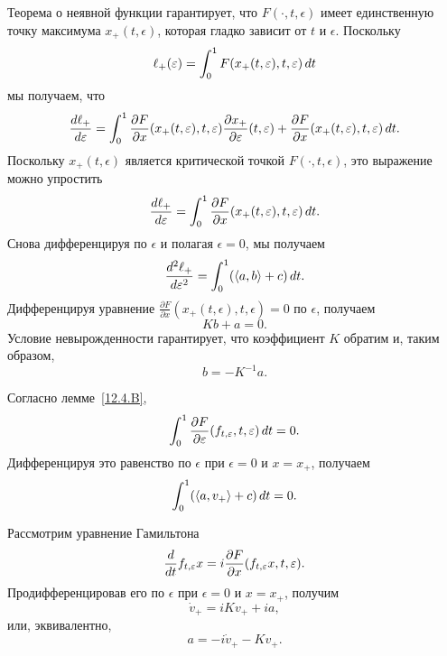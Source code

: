 Теорема о неявной функции гарантирует, что $F(\cdot, t, \epsilon)$ имеет единственную точку максимума $x_+(t, \epsilon)$, которая гладко зависит от $t$ и $\epsilon$.
Поскольку 
\[\ell_+(\varepsilon)=\int_0^1F(x_+(t,\varepsilon),t,\varepsilon)\,d t\]
мы получаем, что
\[\frac{d \ell_+}{d \varepsilon}
=
\int_0^1
\frac{\partial F}{\partial x}(x_+(t,\varepsilon),t,\varepsilon)\frac{\partial x_+}{\partial \varepsilon}(t,\varepsilon)
+
\frac{\partial F}{\partial x}(x_+(t,\varepsilon),t,\varepsilon)\,d t.
\]
Поскольку $x_+(t,\epsilon)$ является критической точкой $F(\cdot,t,\epsilon)$, это выражение можно упростить
\[\frac{d \ell_+}{d \varepsilon}
=
\int_0^1
\frac{\partial F}{\partial x}(x_+(t,\varepsilon),t,\varepsilon)\,d t.
\]
Снова дифференцируя по $\epsilon$ и полагая $\epsilon = 0$, мы получаем 
\begin{equation}
\frac{d^2 \ell_+}{d\varepsilon^2}=\int_0^1 (\langle a, b\rangle +c)\,d t.
\label{eq:12.4.C}
\end{equation}
Дифференцируя уравнение 
$\frac{\partial F}{\partial x}(x_+ (t, \epsilon), t, \epsilon) = 0$ по
$\epsilon$, получаем 
\[Kb+a = 0.\]
Условие невырожденности гарантирует, что коэффициент $K$ обратим и,
таким образом,  
\begin{equation}
b=-K^{-1}a.
\label{eq:12.4.D}
\end{equation}

Согласно лемме~\ref{12.4.B}, 
\[\int_0^1\frac{\partial F}{\partial
  \varepsilon}(f_{t,\varepsilon},t,\varepsilon)\,d t=0.\] 
Дифференцируя это равенство по $\epsilon$ при $\epsilon = 0$ и $x =
x_+$, получаем  
\begin{equation}
\int_0^1(\langle a, v_+\rangle+c)\,d t = 0.
\label{eq:12.4.E}
\end{equation}

Рассмотрим уравнение Гамильтона
\[\frac{d}{d t}f_{t,\varepsilon}x=i\frac{\partial F}{\partial
  x}(f_{t,\varepsilon}x,t,\varepsilon).\] 
Продифференцировав его по $\epsilon$ при $\epsilon = 0$ и $x = x_+$,
получим
\[\dot v_+=iKv_++ia,\]
или, эквивалентно,
\begin{equation}
a=-i\dot v_+-Kv_+.
\label{eq:12.4.F}
\end{equation}

